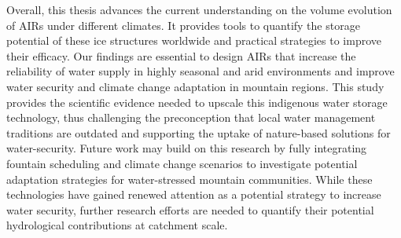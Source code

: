 Overall, this thesis advances the current understanding on the volume evolution of AIRs under different
climates. It provides tools to quantify the storage potential of these ice structures worldwide and practical
strategies to improve their efficacy. Our findings are essential to design AIRs that increase the reliability of
water supply in highly seasonal and arid environments and improve water security and climate change adaptation
in mountain regions. This study provides the scientific evidence needed to upscale this indigenous water storage
technology, thus challenging the preconception that local water management traditions are outdated and
supporting the uptake of nature-based solutions for water-security.  Future work may build on this research by
fully integrating fountain scheduling and climate change scenarios to investigate potential adaptation
strategies for water-stressed mountain communities. While these technologies have gained renewed attention as a
potential strategy to increase water security, further research efforts are needed to quantify their potential
hydrological contributions at catchment scale.




